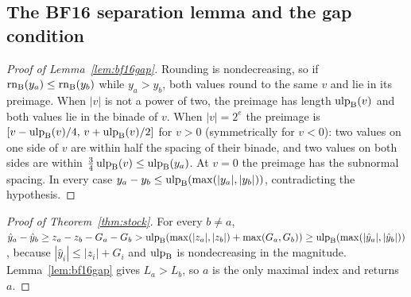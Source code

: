 \subsection{The BF16 separation lemma and the gap condition}\label{app:bf16gap}
\begin{proof}[Proof of Lemma~\ref{lem:bf16gap}]
Rounding is nondecreasing, so if $\operatorname{rn}_{\mathrm{B}}(y_a)\le\operatorname{rn}_{\mathrm{B}}(y_b)$ while $y_a>y_b$, both values round to the same $v$ and lie in its preimage. When $|v|$ is not a power of two, the preimage has length $\operatorname{ulp}_{\mathrm{B}}(v)$ and both values lie in the binade of $v$. When $|v|=2^e$ the preimage is $[v-\operatorname{ulp}_{\mathrm{B}}(v)/4,\,v+\operatorname{ulp}_{\mathrm{B}}(v)/2]$ for $v>0$ (symmetrically for $v<0$): two values on one side of $v$ are within half the spacing of their binade, and two values on both sides are within $\tfrac34\operatorname{ulp}_{\mathrm{B}}(v)\le\operatorname{ulp}_{\mathrm{B}}(y_a)$. At $v=0$ the preimage has the subnormal spacing. In every case $y_a-y_b\le\operatorname{ulp}_{\mathrm{B}}(\max(|y_a|,|y_b|))$, contradicting the hypothesis.
\end{proof}
\begin{proof}[Proof of Theorem~\ref{thm:stock}]
For every $b\ne a$, $\hat y_a-\hat y_b\ge z_a-z_b-G_a-G_b>\operatorname{ulp}_{\mathrm{B}}(\max(|z_a|,|z_b|)+\max(G_a,G_b))\ge\operatorname{ulp}_{\mathrm{B}}(\max(|\hat y_a|,|\hat y_b|))$, because $|\hat y_i|\le|z_i|+G_i$ and $\operatorname{ulp}_{\mathrm{B}}$ is nondecreasing in the magnitude. Lemma~\ref{lem:bf16gap} gives $L_a>L_b$, so $a$ is the only maximal index and \Rstock{} returns $a$.
\end{proof}

